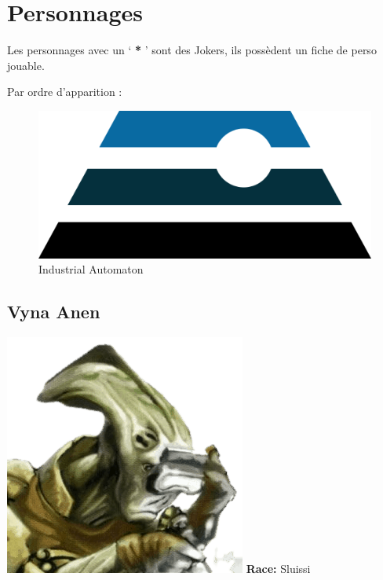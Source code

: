 \section{Personnages}
Les personnages avec un ‘ \textbf{*} ’ sont des Jokers, ils possèdent un fiche de perso jouable. 

Par ordre d’apparition :

\begin{figure}[h!]
    \centering
    \includegraphics[width=\linewidth]{_img/dos-au-muur/industrial-automaton.png}
    \caption{Industrial Automaton}
\end{figure}

\newpage
\subsection{Vyna Anen} \label{sec:vyna-anen}
\noindent\includegraphics[width=\linewidth]{_img/dos-au-muur/vyna-anen.png}
\textbf{Race:} Sluissi

